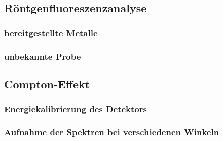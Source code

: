 \documentclass[12pt,english,ngerman]{scrartcl}
\begin{document}
\subsection{Röntgenfluoreszenzanalyse}

\subsubsection{bereitgestellte Metalle}


\subsubsection{unbekannte Probe}


\subsection{Compton-Effekt}

\subsubsection{Energiekalibrierung des Detektors}

\subsubsection{Aufnahme der Spektren bei verschiedenen Winkeln}


\newpage
\printbibliography
\listoffigures
\listoftables
\end{document}
